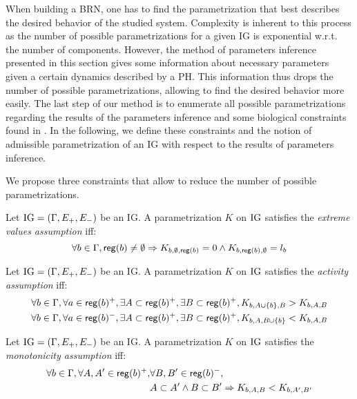 When building a BRN, one has to find the parametrization that best describes the desired behavior of the studied system. Complexity is inherent to this process as the number of possible parametrizations for a given IG is exponential w.r.t. the number of components. However, the method of parameters inference presented in this section gives some information about necessary parameters given a certain dynamics described by a PH. This information thus drops the number of possible parametrizations, allowing to find the desired behavior more easily. The last step of our method is to enumerate all possible parametrizations regarding the results of the parameters inference and some biological constraints found in \cite{BernotSemBRN}. In the following, we define these constraints and the notion of admissible parametrization of an IG with respect to the results of parameters inference.

We propose three constraints that allow to reduce the number of possible parametrizations.

\begin{property}
Let $\mathrm{IG} = (\Gamma, E_+, E_-)$ be an IG. A parametrization $K$ on $\mathrm{IG}$ satisfies the \emph{extreme values assumption} iff:
\label{prop:param_enum_extreme}
\[
  \forall b \in \Gamma, \mathsf{reg}({b}) \neq \emptyset \Rightarrow K_{b,\emptyset,\mathsf{reg}({b})} = 0 \wedge K_{b,\mathsf{reg}({b}),\emptyset} = l_b
\]
\end{property}

\begin{property}
\label{prop:param_enum_activity}
Let $\mathrm{IG} = (\Gamma, E_+, E_-)$ be an IG. A parametrization $K$ on $\mathrm{IG}$ satisfies the \emph{activity assumption} iff:
\begin{align*}
  \forall b \in \Gamma, \forall a \in \mathsf{reg}({b})^+, \exists A \subset \mathsf{reg}({b})^+, \exists B \subset \mathsf{reg}({b})^+,
    K_{b,A \cup \{b\},B} > K_{b,A,B}
\\
  \forall b \in \Gamma, \forall a \in \mathsf{reg}({b})^-, \exists A \subset \mathsf{reg}({b})^+, \exists B \subset \mathsf{reg}({b})^+,
    K_{b,A,B \cup \{b\}} < K_{b,A,B}
\end{align*}
\end{property}

\begin{property}
\label{prop:param_enum_monotonicity}
Let $\mathrm{IG} = (\Gamma, E_+, E_-)$ be an IG. A parametrization $K$ on $\mathrm{IG}$ satisfies the \emph{monotonicity assumption} iff:
\begin{align*}
  \forall b \in \Gamma, \forall A, A' \in \mathsf{reg}({b})^+, &\forall B, B' \in \mathsf{reg}({b})^-,
\\
  &A \subset A' \wedge B \subset B' \Rightarrow K_{b,A,B} < K_{b,A',B'}
\end{align*}
\end{property}

